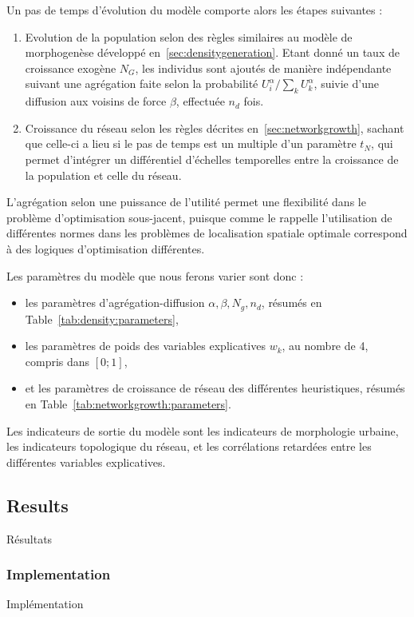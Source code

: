 Un pas de temps d'évolution du modèle comporte alors les étapes suivantes :
\begin{enumerate}
	\item Evolution de la population selon des règles similaires au modèle de morphogenèse développé en~\ref{sec:densitygeneration}. Etant donné un taux de croissance exogène $N_G$, les individus sont ajoutés de manière indépendante suivant une agrégation faite selon la probabilité $U_i^\alpha/\sum_k U_k^\alpha$, suivie d'une diffusion aux voisins de force $\beta$, effectuée $n_d$ fois.
	\item Croissance du réseau selon les règles décrites en~\ref{sec:networkgrowth}, sachant que celle-ci a lieu si le pas de temps est un multiple d'un paramètre $t_N$, qui permet d'intégrer un différentiel d'échelles temporelles entre la croissance de la population et celle du réseau.
\end{enumerate}

L'agrégation selon une puissance de l'utilité permet une flexibilité dans le problème d'optimisation sous-jacent, puisque comme le rappelle \cite{josselin2013revisiting} l'utilisation de différentes normes dans les problèmes de localisation spatiale optimale correspond à des logiques d'optimisation différentes.


Les paramètres du modèle que nous ferons varier sont donc :
\begin{itemize}
	\item les paramètres d'agrégation-diffusion $\alpha,\beta,N_g,n_d$, résumés en Table~\ref{tab:density:parameters},
	\item les paramètres de poids des variables explicatives $w_k$, au nombre de 4, compris dans $[0;1]$,
	\item et les paramètres de croissance de réseau des différentes heuristiques, résumés en Table~\ref{tab:networkgrowth:parameters}.
\end{itemize}

Les indicateurs de sortie du modèle sont les indicateurs de morphologie urbaine, les indicateurs topologique du réseau, et les corrélations retardées entre les différentes variables explicatives.


\subsection{Results}{Résultats}

\subsubsection{Implementation}{Implémentation}

